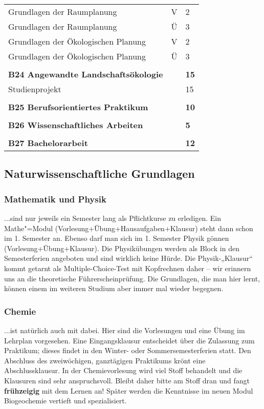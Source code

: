 \begin{longtable}{p{} p{} p{}}
Grundlagen der Raumplanung & V & 2\\
Grundlagen der Raumplanung & Ü & 3\\
Grundlagen der Ökologischen Planung & V & 2\\
Grundlagen der Ökologischen Planung & Ü & 3\\
&&\\
\textbf{B24 Angewandte Landschaftsökologie} && \textbf{15}\\
Studienprojekt & & 15\\
&&\\
\textbf{B25 Berufsorientiertes Praktikum} & & \textbf{10}\\
&&\\
\textbf{B26 Wissenschaftliches Arbeiten} & & \textbf{5}\\
&&\\
\textbf{B27 Bachelorarbeit} && \textbf{12}\\
\end{longtable}

\subsection*{Naturwissenschaftliche Grundlagen}
\subsubsection*{Mathematik und Physik}
...sind nur jeweils ein Semester lang als Pﬂichtkurse zu erledigen. Ein Mathe"=Modul (Vorlesung+Übung+Hausaufgaben+Klausur) steht dann schon im 1. Semester an. Ebenso darf man sich im 1. Semester Physik gönnen (Vorlesung+Übung+Klausur). Die Physikübungen werden als Block in den Semesterferien angeboten und sind wirklich keine Hürde. Die Physik-„Klausur“ kommt getarnt als Multiple-Choice-Test mit Kopfrechnen daher – wir erinnern uns an die theoretische Führerscheinprüfung. Die Grundlagen, die man hier lernt, können einem im weiteren Studium aber immer mal wieder begegnen.

\subsubsection*{Chemie}
...ist natürlich auch mit dabei. Hier sind die Vorlesungen und eine Übung im Lehrplan vorgesehen. Eine Eingangsklausur entscheidet über die Zulassung zum Praktikum; dieses ﬁndet in den Winter- oder Sommersemesterferien statt. Den Abschluss des zweiwöchigen, ganztägigen Praktikums krönt eine Abschlussklausur. In der Chemievorlesung wird viel Stoff behandelt und die Klausuren sind sehr anspruchsvoll. Bleibt daher bitte am Stoff dran und fangt \textbf{frühzeigig} mit dem Lernen an! Später werden die Kenntnisse im neuen Modul Biogeochemie vertieft und spezialisiert.

